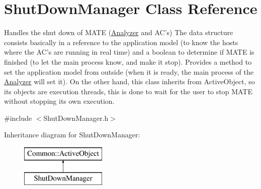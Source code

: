 \hypertarget{class_shut_down_manager}{\section{Shut\-Down\-Manager Class Reference}
\label{class_shut_down_manager}
}


Handles the shut down of M\-A\-T\-E (\hyperlink{class_analyzer}{Analyzer} and A\-C's) The data structure consists basically in a reference to the application model (to know the hosts where the A\-C's are running in real time) and a boolean to determine if M\-A\-T\-E is finished (to let the main process know, and make it stop). Provides a method to set the application model from outside (when it is ready, the main process of the \hyperlink{class_analyzer}{Analyzer} will set it). On the other hand, this class inherits from Active\-Object, so its objects are execution threads, this is done to wait for the user to stop M\-A\-T\-E without stopping its own execution.  




{\ttfamily \#include $<$Shut\-Down\-Manager.\-h$>$}

Inheritance diagram for Shut\-Down\-Manager\-:\begin{figure}[H]
\begin{center}
\leavevmode
\includegraphics[height=2.000000cm]{class_shut_down_manager}
\end{center}
\end{figure}
